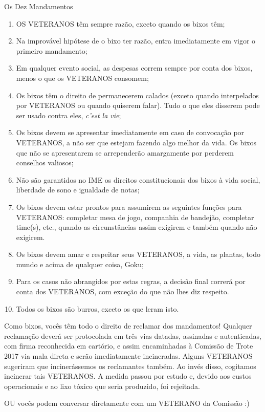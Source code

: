 \begin{editorial}{Os Dez Mandamentos}

\begin{enumerate}
  \item OS VETERANOS têm sempre razão, exceto quando os bixos têm;
  \item Na improvável hipótese de o bixo ter razão, entra imediatamente em vigor
        o primeiro mandamento;
  \item Em qualquer evento social, as despesas correm sempre por conta dos
        bixos, menos o que os VETERANOS consomem;
  \item Os bixos têm o direito de permanecerem calados (exceto quando
        interpelados por VETERANOS ou quando quiserem falar). Tudo o que eles
        disserem pode ser usado contra eles, \textit{c’est la vie};
  \item Os bixos devem se apresentar imediatamente em caso de convocação por
        VETERANOS, a não ser que estejam fazendo algo melhor da vida. Os bixos
        que não se apresentarem se arrependerão amargamente por perderem
        conselhos valiosos; %
  \item Não são garantidos no IME os direitos constitucionais dos bixos à vida
        social, liberdade de sono e igualdade de notas;
  \item Os bixos devem estar prontos para assumirem as seguintes funções para
        VETERANOS: completar mesa de jogo, companhia de bandejão, completar
        time(s), etc., quando as circunstâncias assim exigirem e também quando
        não exigirem.
  \item Os bixos devem amar e respeitar seus VETERANOS, a vida, as plantas,
        todo mundo e acima de qualquer coisa, Goku;
  \item Para os casos não abrangidos por estas regras, a decisão final correrá
        por conta dos VETERANOS, com exceção do que não lhes diz respeito.
  \item Todos os bixos são burros, exceto os que leram isto.
\end{enumerate}

Como bixos, vocês têm todo o direito de reclamar dos mandamentos! Qualquer
reclamação deverá ser protocolada em três vias datadas, assinadas e
autenticadas, com firma reconhecida em cartório, e assim encaminhadas à
Comissão de Trote 2017 %
via mala direta e serão imediatamente incineradas. Alguns VETERANOS sugeriram
que incinerássemos os reclamantes também. Ao invés disso, cogitamos incinerar
tais VETERANOS. A medida passou por estudo e, devido aos custos operacionais e
ao lixo tóxico que seria produzido, foi rejeitada.

OU vocês podem conversar diretamente com um VETERANO da Comissão :)

\end{editorial}
